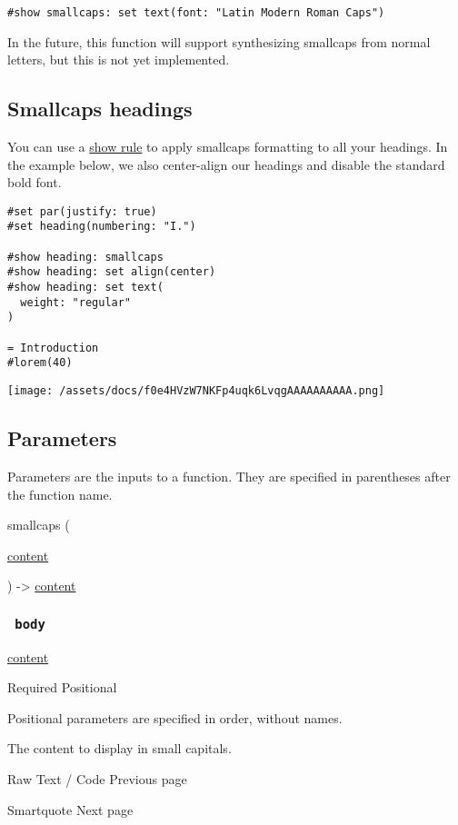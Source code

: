 \begin{verbatim}
#show smallcaps: set text(font: "Latin Modern Roman Caps")
\end{verbatim}

In the future, this function will support synthesizing smallcaps from
normal letters, but this is not yet implemented.

\subsection{Smallcaps headings}\label{smallcaps-headings}

You can use a \href{/docs/reference/styling/\#show-rules}{show rule} to
apply smallcaps formatting to all your headings. In the example below,
we also center-align our headings and disable the standard bold font.

\begin{verbatim}
#set par(justify: true)
#set heading(numbering: "I.")

#show heading: smallcaps
#show heading: set align(center)
#show heading: set text(
  weight: "regular"
)

= Introduction
#lorem(40)
\end{verbatim}

\texttt{[image: /assets/docs/f0e4HVzW7NKFp4uqk6LvqgAAAAAAAAAA.png]}

\subsection{\texorpdfstring{{ Parameters
}}{ Parameters }}\label{parameters}

\label{parameters-tooltip}
Parameters are the inputs to a function. They are specified in
parentheses after the function name.

{ smallcaps } (

{ \href{/docs/reference/foundations/content/}{content} }

) -\textgreater{} \href{/docs/reference/foundations/content/}{content}

\subsubsection{\texorpdfstring{\texttt{\ body\ }}{ body }}\label{parameters-body}

\href{/docs/reference/foundations/content/}{content}

{Required} {{ Positional }}

\label{parameters-body-positional-tooltip}
Positional parameters are specified in order, without names.

The content to display in small capitals.

\href{/docs/reference/text/raw/}{\pandocbounded{}}

{ Raw Text / Code } { Previous page }

\href{/docs/reference/text/smartquote/}{\pandocbounded{}}

{ Smartquote } { Next page }
